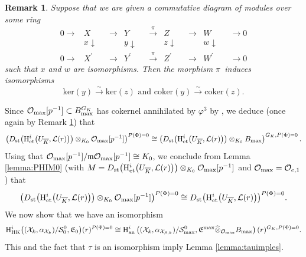 \documentclass[asterisque,english]{smfart}
\newtheorem{remark}[theo]{Remark}
\begin{document}
\begin{remark}\label{remark:Marco}
Suppose that we are given a commutative diagram of modules over some ring
\begin{equation*}
\begin{array}{ccccccccc}
0\longrightarrow  & X & \longrightarrow  & Y & \overset{\pi }{
\longrightarrow } & Z & \longrightarrow  & W & \longrightarrow 0 \\ 
& x\downarrow \text{ } &  & y\downarrow \text{ } &  & z\downarrow \text{ } & 
& w\downarrow \text{ } &  \\ 
0\longrightarrow  & X^{\prime } & \longrightarrow  & Y^{\prime } & \overset{
\pi }{\longrightarrow } & Z^{\prime } & \longrightarrow  & W^{\prime } & 
\longrightarrow 0
\end{array}
\end{equation*}
such that $x$ and $w$ are isomorphisms. Then the morphism $\pi $\ induces
isomorphisms
\begin{equation*}
\mathrm{ker}\left( y\right) \overset{\sim }{\longrightarrow }\mathrm{ker}
\left( z\right) \text{ and }\mathrm{coker}\left( y\right) \overset{\sim }{
\longrightarrow }\mathrm{coker}\left( z\right) .
\end{equation*}
\end{remark}

Since $\mathcal{O}_{\rm max}[p^{-1}]\subset B_{\rm max}^{G_K}$ has cokernel annihilated by $\varphi^3$ by \cite[Prop. 5.1.1]{Breuil}, we deduce (once again by Remark \ref{remark:Marco}) that 
$$\bigl(D_{\rm st}\bigl(\mathrm{H}^i_{\mathrm{et}}\bigl(U_{\overline{K}}, \mathcal{L}(r)\bigr) \bigr)\otimes_{K_0} \mathcal{O}_{\rm max}[p^{-1}]\bigr)^{P(\Phi)=0}  \cong\left( D_{\rm st}\bigl(\mathrm{H}^i_{\mathrm{et}}\bigl(U_{\overline{K}}, \mathcal{L}(r)\bigr) \bigr) \otimes_{K_0} B_{\rm max} \right)^{G_K,P(\Phi)=0}.  $$Using that $\mathcal{O}_{\rm max}[p^{-1}]/ \mathfrak{m}\mathcal{O}_{\rm max}[p^{-1}]\cong K_0$, we conclude from Lemma \ref{lemma:PHIM0} (with $M= D_{\rm st}\bigl(\mathrm{H}^i_{\mathrm{et}}\bigl(U_{\overline{K}}, \mathcal{L}(r)\bigr) \bigr)\otimes_{K_0} \mathcal{O}_{\rm max}[p^{-1}]$ and $\mathcal{O}_{\rm max}= \mathcal{O}_{e,1}$) that $$\bigl(D_{\rm st}\bigl(\mathrm{H}^i_{\mathrm{et}}\bigl(U_{\overline{K}}, \mathcal{L}(r)\bigr) \bigr)\otimes_{K_0} \mathcal{O}_{\rm max}[p^{-1}]\bigr)^{P(\Phi)=0}  \cong D_{\rm st}\bigl(\mathrm{H}^i_{\mathrm{et}}\bigl(U_{\overline{K}}, \mathcal{L}(r)\bigr) \bigr)^{P(\Phi)=0}  .$$We now show that we have an isomorphism
$$ \mathrm{H}^i_{\mathrm{HK}}\bigl((\mathcal{X}_k,\alpha_{\mathcal{X}_k})/\mathcal{S}_0^0, \mathfrak{E}_0\bigr)(r)^ {P(\Phi)=0}\cong  \mathrm{H}^i_{\mathrm{an}}\left((\mathcal{X}_k,\alpha_{\mathcal{X}_{\beta,k}})/\mathcal{S}_{\rm max}^0,\mathfrak{E}^{\rm max} \widehat{\otimes}_{\mathcal{O}_{\rm max}} B_{\rm max}\right)(r)^{G_K,P(\Phi)=0}.$$This and the fact that $\tau$ is an isomorphism imply Lemma \ref{lemma:tauimples}.
\end{document}
